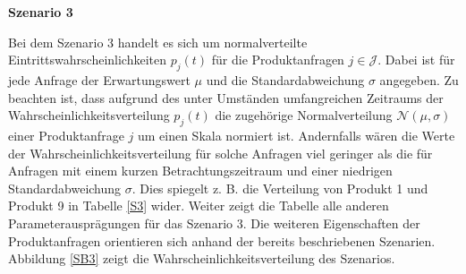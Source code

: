 \textbf{Szenario 3}

Bei dem Szenario 3 handelt es sich um normalverteilte Eintrittswahrscheinlichkeiten $p_j(t)$ für die Produktanfragen $j\in\mathcal{J}$. Dabei ist für jede Anfrage der Erwartungswert $\mu$ und die Standardabweichung $\sigma$ angegeben. Zu beachten ist, dass aufgrund des unter Umständen umfangreichen Zeitraums der Wahrscheinlichkeitsverteilung $p_j(t)$ die zugehörige Normalverteilung $\mathcal{N}(\mu,\sigma)$ einer Produktanfrage $j$ um einen Skala normiert ist. Andernfalls wären die Werte der Wahrscheinlichkeitsverteilung für solche Anfragen viel geringer als die für Anfragen mit einem kurzen Betrachtungszeitraum und einer niedrigen Standardabweichung $\sigma$. Dies spiegelt z. B. die Verteilung von Produkt 1 und Produkt 9 in Tabelle \ref{S3} wider. Weiter zeigt die Tabelle alle anderen Parameterausprägungen für das Szenario 3. Die weiteren Eigenschaften der Produktanfragen orientieren sich anhand der bereits beschriebenen Szenarien. Abbildung \ref{SB3} zeigt die Wahrscheinlichkeitsverteilung des Szenarios.

